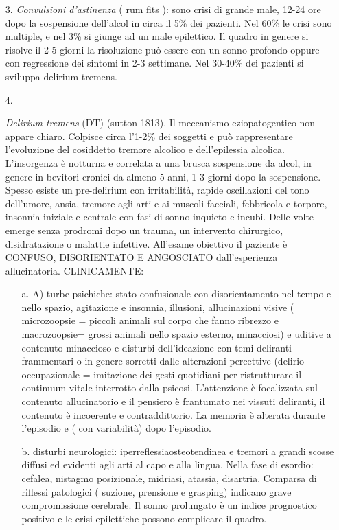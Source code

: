 \begin{itemize}
\begin{itemize}
\item[3.] \emph{Convulsioni d'astinenza} ( rum fits ): sono crisi di grande
  male, 12-24 ore dopo la sospensione dell'alcol in circa il 5\% dei
  pazienti. Nel 60\% le crisi sono multiple, e nel 3\% si giunge ad un
  male epilettico. Il quadro in genere si risolve il 2-5 giorni la
  risoluzione può essere con un sonno profondo oppure con regressione
  dei sintomi in 2-3 settimane. Nel 30-40\% dei pazienti si sviluppa
  delirium tremens.
  
\item[4.]
  
  \emph{Delirium tremens} (DT) (sutton 1813). Il meccanismo
  eziopatogentico non appare chiaro. Colpisce circa l'1-2\% dei soggetti
  e può rappresentare l'evoluzione del cosiddetto tremore alcolico e
  dell'epilessia alcolica. L'insorgenza è notturna e correlata a una
  brusca sospensione da alcol, in genere in bevitori cronici da almeno 5
  anni, 1-3 giorni dopo la sospensione. Spesso esiste un pre-delirium
  con irritabilità, rapide oscillazioni del tono dell'umore, ansia,
  tremore agli arti e ai muscoli facciali, febbricola e torpore,
  insonnia iniziale e centrale con fasi di sonno inquieto e incubi.
  Delle volte emerge senza prodromi dopo un trauma, un intervento
  chirurgico, disidratazione o malattie infettive. All'esame obiettivo
  il paziente è CONFUSO, DISORIENTATO E ANGOSCIATO dall'esperienza
  allucinatoria. CLINICAMENTE:

\begin{itemize}
\item[a.]
  A) turbe psichiche: stato confusionale con disorientamento nel tempo e
  nello spazio, agitazione e insonnia, illusioni, allucinazioni visive (
  microzoopsie = piccoli animali sul corpo che fanno ribrezzo e
  macrozoopsie= grossi animali nello spazio esterno, minacciosi) e
  uditive a contenuto minaccioso e disturbi dell'ideazione con temi
  deliranti frammentari o in genere sorretti dalle alterazioni
  percettive (delirio occupazionale = imitazione dei gesti quotidiani
  per ristrutturare il continuum vitale interrotto dalla psicosi.
  L'attenzione è focalizzata sul contenuto allucinatorio e il pensiero è
  frantumato nei vissuti deliranti, il contenuto è incoerente e
  contraddittorio. La memoria è alterata durante l'episodio e ( con
  variabilità) dopo l'episodio.
  
\item[b.]
 disturbi neurologici: iperreflessiaosteotendinea e tremori a grandi
  scosse diffusi ed evidenti agli arti al capo e alla lingua. Nella fase
  di esordio: cefalea, nistagmo posizionale, midriasi, atassia,
  disartria. Comparsa di riflessi patologici ( suzione, prensione e
  grasping) indicano grave compromissione cerebrale. Il sonno prolungato
  è un indice prognostico positivo e le crisi epilettiche possono
  complicare il quadro.
  

\end{itemize}
\end{itemize}
\end{itemize}
